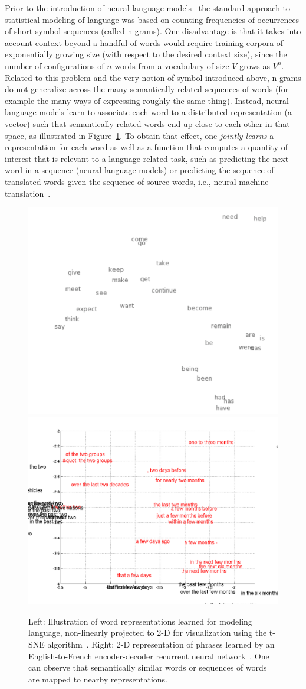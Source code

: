 \documentclass[]{article}
\begin{document}
Prior to the introduction of neural language
models~\citet{BenDucVin01-short} the standard approach to statistical
modeling of language was based on counting frequencies of occurrences of
short symbol sequences (called n-grams). One disadvantage is that it
takes into account context beyond a handful of words would require
training corpora of exponentially growing size (with respect to the
desired context size), since the number of configurations of $n$
words from a vocabulary of size $V$ grows as $V^n$. Related to this
problem and the very notion of symbol introduced above, n-grams
do not generalize across the many semantically related sequences 
of words (for example the many ways of expressing roughly the same thing).
Instead, neural language models learn to associate each word to a
distributed representation (a vector) such that semantically related
words end up close to each other in that space, as illustrated in
Figure~\ref{fig:word-embeddings}. To obtain that effect, one
{\em jointly learns} a representation for each word as well as
a function that computes a quantity of interest that is relevant
to a language related task, such as predicting the next word
in a sequence (neural language models) or predicting the sequence
of translated words given the sequence of source words, i.e., neural
machine translation~\citep{Bahdanau-et-al-arxiv2014,Sutskever-et-al-NIPS2014}.


\begin{figure}[H]
\centerline{
\includegraphics[width=0.49\linewidth]{word-embeddings.png}
\includegraphics[width=0.49\linewidth]{phrase_zoom2.png}
}
\caption{Left: Illustration of word representations learned for modeling
language, non-linearly projected to 2-D for visualization using the
t-SNE algorithm~\citep{VanDerMaaten08}. Right: 2-D representation
of phrases learned by an English-to-French encoder-decoder recurrent
neural network~\citep{Cho-et-al-EMNLP2014}. One can observe that
semantically similar words or sequences of words are  mapped to
nearby representations.
}
\label{fig:word-embeddings}
\end{figure}
\end{document}

